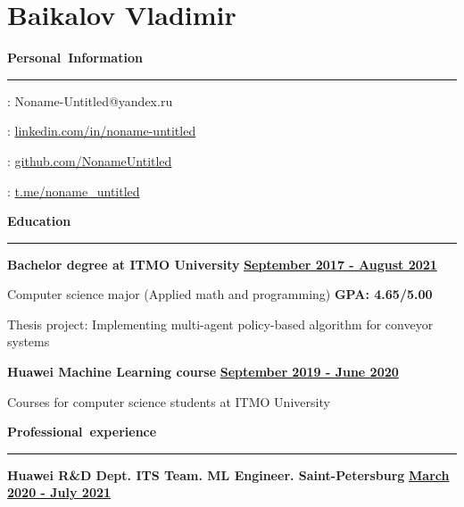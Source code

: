 \documentclass[11pt,a4paper]{report}
\author{Baykalov Vladimir}
\begin{document}
\section*{\huge{Baikalov Vladimir}}

\par\hbox{\Large\textbf{Personal Information}}\kern3pt\hrule
\begin{multicols}{2}

\hspace{5px}
\Letter: Noname-Untitled@yandex.ru

\hspace{5px}
\faLinkedin : \href{https://www.linkedin.com/in/noname-untitled}{linkedin.com/in/noname-untitled}

\par

\faGithub:  \href{http://www.github.com/NonameUntitled}{github.com/NonameUntitled}

\faSend:  \href{http://www.t.me/noname\_untitled}{t.me/noname\_untitled}

\end{multicols}

\par\hbox{\Large\textbf{Education}}\kern5pt\hrule\kern10pt

\textbf{\large{Bachelor degree at ITMO University}}
\hfill
\textbf{\underline{September 2017 - August 2021}}

\vspace{7px}
\hspace{10px}
Computer science major (Applied math and programming) \hfill \textbf{\large{GPA: 4.65/5.00}}

\vspace{5px}
\hspace{10px}
Thesis project: Implementing multi-agent policy-based algorithm for conveyor systems

\vspace{10px}
\textbf{\large{Huawei Machine Learning course}}
\hfill
\textbf{\underline{September 2019 - June 2020}}

\vspace{5px}
\hspace{10px}
Courses for computer science students at ITMO University


\vspace{10px}
\par\hbox{\Large\textbf{Professional experience}}\kern3pt\hrule\kern10pt

\textbf{\large{Huawei R\&D Dept. ITS Team. ML Engineer. Saint-Petersburg}}
\hfill
\textbf {\underline{March 2020 - July 2021}}
\end{document}

